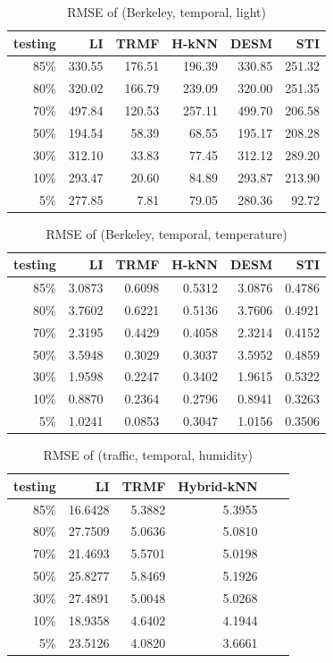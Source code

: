 \begin{table}[htbp]
\centering
\caption{RMSE of (Berkeley, temporal, light)}
\label{table:berkeley_temporal_light}
\begin{tabular}{ r | r r r r r}
	testing	&LI	&TRMF	&H-kNN	&DESM	&STI\\ \hline
	85\%	&330.55	&176.51	&196.39	&330.85	&251.32\\ 
	80\%	&320.02	&166.79	&239.09	&320.00	&251.35\\
	70\%	&497.84	&120.53	&257.11	&499.70	&206.58\\
	50\%	&194.54	&58.39	&68.55	&195.17	&208.28\\
	30\%	&312.10	&33.83	&77.45	&312.12	&289.20\\
	10\%	&293.47	&20.60	&84.89	&293.87	&213.90\\
	 5\%	&277.85	&7.81	&79.05	&280.36	& 92.72\\
\end{tabular}
\end{table}


\begin{table}[htbp]
\centering
\caption{RMSE of (Berkeley, temporal, temperature)}
\label{table:berkeley_temporal_tem}
\begin{tabular}{ r | r r r r r}
	testing	&LI	&TRMF	&H-kNN	&DESM	&STI\\ \hline
	85\%	&3.0873	&0.6098	&0.5312	&3.0876	&0.4786\\ 
	80\%	&3.7602	&0.6221	&0.5136	&3.7606	&0.4921\\
	70\%	&2.3195	&0.4429	&0.4058	&2.3214	&0.4152\\
	50\%	&3.5948	&0.3029	&0.3037	&3.5952	&0.4859\\
	30\%	&1.9598	&0.2247	&0.3402	&1.9615	&0.5322\\
	10\%	&0.8870	&0.2364	&0.2796	&0.8941	&0.3263\\
	 5\%	&1.0241	&0.0853	&0.3047	&1.0156	&0.3506\\
\end{tabular}
\end{table}

\begin{table} [htbp]
\centering
\caption{RMSE of (traffic, temporal, humidity)}
\label{table:traffic_temporal_hum}
\begin{tabular}{ r | r r r r r}
	testing	&LI	&TRMF	&Hybrid-kNN \\ \hline
	85\%	&16.6428	&5.3882	&5.3955\\ 
	80\%	&27.7509	&5.0636	&5.0810\\
	70\%	&21.4693	&5.5701	&5.0198\\
	50\%	&25.8277	&5.8469	&5.1926\\
	30\%	&27.4891	&5.0048	&5.0268\\
	10\%	&18.9358	&4.6402	&4.1944\\
	 5\%	&23.5126	&4.0820	&3.6661\\
\end{tabular}
\end{table}


